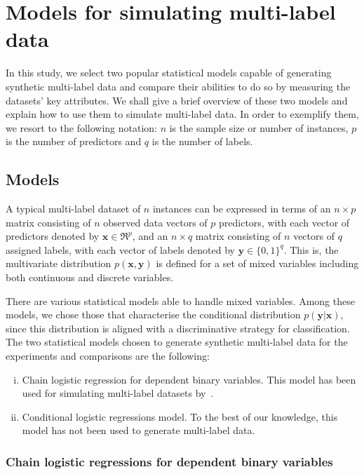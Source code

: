 \documentclass[review]{elsarticle}
\begin{document}
\section{Models for simulating multi-label data}
\label{MODELS}

In this study, we select two popular statistical models capable of generating synthetic multi-label data and compare their abilities to do so by measuring the datasets' key attributes. We shall give a brief overview of these two models and explain how to use them to simulate multi-label data.  In order to exemplify them, we resort to the following notation: $n$ is the sample size or number of instances, $p$ is the number of predictors and $q$ is the number of labels.

\subsection{Models}\label{ss:models}

A typical multi-label dataset of $n$ instances can be expressed in terms of an $n\times p$ matrix consisting of $n$ observed data vectors of $p$ predictors, with each vector of predictors denoted by $\mathbf{x} \in \Re^{p}$, and an $n\times q$ matrix consisting of $n$ vectors of $q$ assigned labels, with each vector of labels denoted by $\mathbf{y} \in \{ 0,1 \}^{q}$. This is, the multivariate distribution $p(\mathbf{x},\mathbf{y})$ is defined for a set of mixed variables including both continuous and discrete variables.

There are various statistical models able to handle mixed variables. Among these models, we chose those that characterise the conditional distribution $p(\mathbf{y}|\mathbf{x})$, since this distribution is aligned with a discriminative strategy for classification.
The two statistical models chosen to generate synthetic multi-label data for the experiments and comparisons are the following:
\begin{enumerate}[(i)]
	\item Chain logistic regression for dependent binary variables. This model has been used for simulating multi-label datasets by~\citet{PCC}.
	\item Conditional logistic regressions model. To the best of our knowledge, this model has not been used to generate multi-label data.
\end{enumerate}

\subsubsection{Chain logistic regressions for dependent binary variables}
\end{document}
